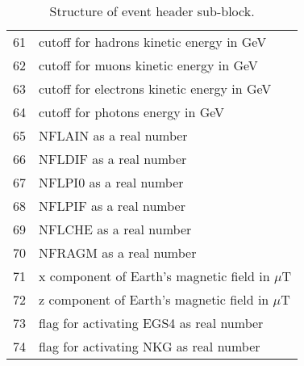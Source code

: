 {\begin{table}[t]
\begin{center}
\begin{tabular}{|r|l|}
61& cutoff for hadrons kinetic energy in GeV  \\
62& cutoff for muons kinetic energy in GeV  \\
63& cutoff for electrons kinetic energy in GeV  \\
64& cutoff for photons energy in GeV  \\
65& NFLAIN as a real number  \\
66& NFLDIF as a real number  \\
67& NFLPI0 as a real number  \\
68& NFLPIF as a real number  \\
69& NFLCHE as a real number  \\
70& NFRAGM as a real number  \\
71& x component of Earth's magnetic field in $\mu$T  \\
72& z component of Earth's magnetic field in $\mu$T  \\
73& flag for activating EGS4 as real number  \\
74& flag for activating NKG as real number \\
\hline
    \end{tabular}
  \end{center}
  \caption{Structure of event header sub-block.}
  \label{tab:eh1}
\end{table}
}

